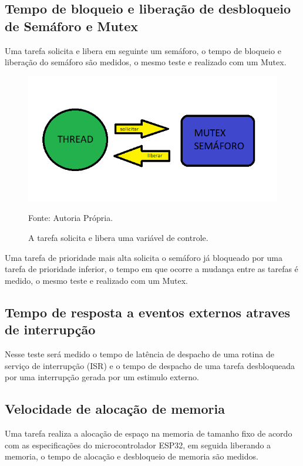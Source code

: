 \subsection{Tempo de bloqueio e liberação de desbloqueio de Semáforo e Mutex}
Uma tarefa solicita e libera em seguinte um semáforo, o tempo de bloqueio e
liberação do semáforo são medidos, o mesmo teste e realizado com um Mutex.

\begin{figure}[H]
	\centering
	\includegraphics[width=15cm]{imagens/solicitar_bloquear.png}
	\caption{A tarefa solicita e libera uma variável de controle.}
	Fonte: Autoria Própria.
	\label{fig: tempo_semaforo_mutex}
\end{figure}

Uma tarefa de prioridade mais alta solicita o semáforo já bloqueado por uma
tarefa de prioridade inferior, o tempo em que ocorre a mudança entre as tarefas
é medido, o mesmo teste e realizado com um Mutex.

\subsection{Tempo de resposta a eventos externos atraves de interrupção}
Nesse teste será medido o tempo de latência de despacho de uma rotina de serviço de interrupção (ISR) 
e o tempo de despacho de uma tarefa desbloqueada por uma interrupção gerada por um estimulo
externo.

\subsection{Velocidade de alocação de memoria}
Uma tarefa realiza a alocação de espaço na memoria de tamanho fixo de acordo com
as especificações do microcontrolador ESP32, em seguida liberando a memoria,
o tempo de alocação e desbloqueio de memoria são medidos.

